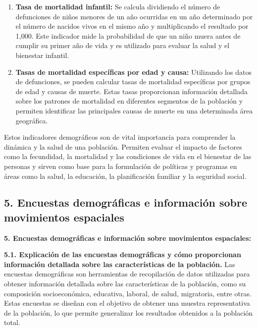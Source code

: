 \documentclass[8pt,a4paper]{beamer}
\begin{document}
{\begin{frame}{}
\begin{block}{}
\begin{enumerate}
\justifying
\item[\ding{102}] \textbf{Tasa de mortalidad infantil:} Se calcula dividiendo el número de defunciones de niños menores de un año ocurridas en un año determinado por el número de nacidos vivos en el mismo año y multiplicando el resultado por 1,000. Este indicador mide la probabilidad de que un niño muera antes de cumplir su primer año de vida y es utilizado para evaluar la salud y el bienestar infantil.
\item[\ding{102}] \textbf{Tasas de mortalidad específicas por edad y causa:} Utilizando los datos de defunciones, se pueden calcular tasas de mortalidad específicas por grupos de edad y causas de muerte. Estas tasas proporcionan información detallada sobre los patrones de mortalidad en diferentes segmentos de la población y permiten identificar las principales causas de muerte en una determinada área geográfica.
\end{enumerate}
Estos indicadores demográficos son de vital importancia para comprender la dinámica y la salud de una población. Permiten evaluar el impacto de factores como la fecundidad, la mortalidad y las condiciones de vida en el bienestar de las personas y sirven como base para la formulación de políticas y programas en áreas como la salud, la educación, la planificación familiar y la seguridad social.
\end{block}
\end{frame}

\subsection{5. Encuestas demográficas e información sobre movimientos espaciales}
\begin{frame}{\textbf{5. Encuestas demográficas e información sobre movimientos espaciales:}}
\begin{block}{\textbf{5.1. Explicación de las encuestas demográficas y cómo proporcionan información detallada sobre las características de la población.}}
\justifying
Las encuestas demográficas son herramientas de recopilación de datos utilizadas para obtener información detallada sobre las características de la población, como su composición socioeconómica, educativa, laboral, de salud, migratoria, entre otras. Estas encuestas se diseñan con el objetivo de obtener una muestra representativa de la población, lo que permite generalizar los resultados obtenidos a la población total.


\end{block}
\end{frame}}
\end{document}
